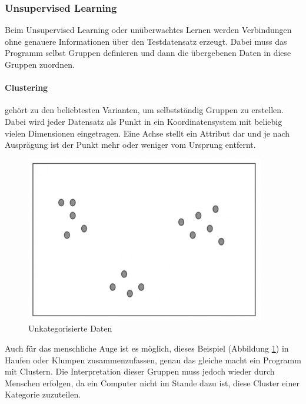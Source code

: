 \subsubsection{Unsupervised Learning}

Beim Unsupervised Learning oder unüberwachtes Lernen werden Verbindungen ohne genauere Informationen über den Testdatensatz erzeugt. Dabei muss das Programm selbst Gruppen definieren und dann die übergebenen Daten in diese Gruppen zuordnen. \cite{SL:online}

\paragraph{Clustering} gehört zu den beliebtesten Varianten, um selbstständig Gruppen zu erstellen. Dabei wird jeder Datensatz als Punkt in ein Koordinatensystem mit beliebig vielen Dimensionen eingetragen. Eine Achse stellt ein Attribut dar und je nach Ausprägung ist der Punkt mehr oder weniger vom Ursprung entfernt.

\begin{figure}[H]
      \centering
      \includegraphics[scale=0.8]{sections/machine-learning/images/unclustered-data.png}
      \caption{Unkategorisierte Daten}
      \label{fig:unclustered-data}
\end{figure}

Auch für das menschliche Auge ist es möglich, dieses Beispiel (Abbildung \ref{fig:unclustered-data}) in Haufen oder Klumpen zusammenzufassen, genau das gleiche macht ein Programm mit Clustern. Die Interpretation dieser Gruppen muss jedoch wieder durch Menschen erfolgen, da ein Computer nicht im Stande dazu ist, diese Cluster einer Kategorie zuzuteilen.

